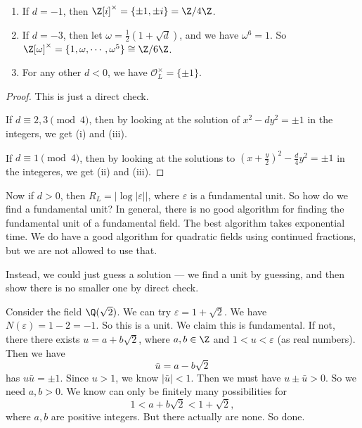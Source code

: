 \documentclass[a4paper]{article}
\begin{document}
\begin{lemma}\leavevmode
  \begin{enumerate}
    \item If $d = -1$, then $\Z[i]^{\times} = \{\pm 1, \pm i\} = \Z/4\Z$.
    \item If $d = -3$, then let $\omega = \frac{1}{2}(1 + \sqrt{d})$, and we have $\omega^6 = 1$. So $\Z[\omega]^{\times} = \{1, \omega, \cdots, \omega^5\} \cong \Z/6\Z$.
    \item For any other $d < 0$, we have $\mathcal{O}_L^\times = \{\pm 1\}$.
  \end{enumerate}
\end{lemma}

\begin{proof}
  This is just a direct check.

  If $d \equiv 2, 3 \pmod 4$, then by looking at the solution of $x^2 - dy^2 = \pm 1$ in the integers, we get (i) and (iii).

  If $d\equiv 1 \pmod 4$, then by looking at the solutions to $\left(x + \frac{y}{2}\right)^2 - \frac{d}{4}y^2 = \pm 1$ in the integeres, we get (ii) and (iii).
\end{proof}

Now if $d > 0$, then $R_L = |\log|\varepsilon||$, where $\varepsilon$ is a fundamental unit. So how do we find a fundamental unit? In general, there is no good algorithm for finding the fundamental unit of a fundamental field. The best algorithm takes exponential time. We do have a good algorithm for quadratic fields using continued fractions, but we are not allowed to use that.

Instead, we could just guess a solution --- we find a unit by guessing, and then show there is no smaller one by direct check.

\begin{eg}
  Consider the field $\Q(\sqrt{2})$. We can try $\varepsilon = 1 + \sqrt{2}$. We have $N(\varepsilon) = 1 - 2 = -1$. So this is a unit. We claim this is fundamental. If not, there there exists $u = a + b\sqrt{2}$, where $a, b \in \Z$ and $1 < u < \varepsilon$ (as real numbers). Then we have
  \[
    \bar{u} = a - b\sqrt{2}
  \]
  has $u\bar{u} = \pm 1$. Since $u > 1$, we know $|\bar{u}| < 1$. Then we must have $u \pm \bar{u} > 0$. So we need $a, b > 0$. We know can only be finitely many possibilities for
  \[
    1 < a + b\sqrt{2} < 1 + \sqrt{2},
  \]
  where $a, b$ are positive integers. But there actually are none. So done.
\end{eg}
\end{document}
